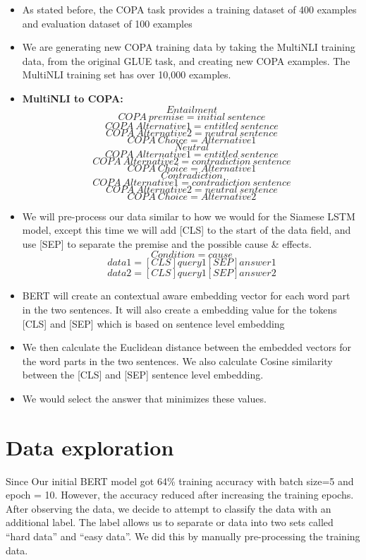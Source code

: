\documentclass{article}
\begin{document}
\begin{itemize}

    \item As stated before, the COPA task provides a training dataset of 400 examples and evaluation dataset of 100 examples
    
    \item We are generating new COPA training data by taking the MultiNLI training data, from the original GLUE task, and creating new COPA examples.  The MultiNLI training set has over 10,000 examples.
    \item \textbf{MultiNLI to COPA:}
    $$Entailment$$
    $$COPA \ premise = initial \ sentence$$
    $$ COPA \ Alternative1 = entitled \ sentence $$
    $$ COPA \ Alternative2 = neutral \ sentence $$
    $$   COPA \ Choice = Alternative1 $$
    $$Neutral$$
    $$ COPA \ Alternative1 = entitled \ sentence $$
    $$ COPA \ Alternative2 = contradiction \ sentence $$
    $$   COPA \ Choice = Alternative1 $$
    $$Contradiction$$
    $$ COPA \ Alternative1 = contradiction \ sentence $$
    $$ COPA \ Alternative2 = neutral \ sentence $$
    $$   COPA \ Choice = Alternative2 $$
    
    \item We will pre-process our data similar to how we would for the Siamese LSTM model, except this time we will add [CLS] to the start of the data field, and use [SEP] to separate the premise and the possible cause \& effects. \\ 
    $$Condition = cause$$
    $$data1 = [CLS]query1 [SEP] answer1$$
    $$data2 = [CLS]query1 [SEP] answer 2$$

    \item BERT will create an contextual aware embedding vector for each word part in the two sentences.  It will also create a embedding value for the tokens [CLS] and [SEP] which is based on sentence level embedding
    \item We then calculate the Euclidean distance between the embedded vectors for the word parts in the two sentences.  We also calculate Cosine similarity between the [CLS] and [SEP] sentence level embedding.
    \item We would select the answer that minimizes these values.
\end{itemize}
\section{Data exploration}
Since Our initial BERT model got 64\% training accuracy with batch size=5 and epoch = 10. However, the accuracy reduced after increasing the training epochs. After observing the data, we decide to attempt to classify the data with an additional label.  The label allows us to separate or data into two sets called “hard data” and “easy data”.  We did this by manually pre-processing the training data.
\end{document}

